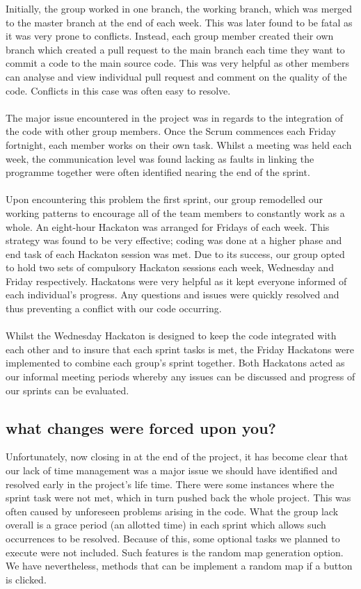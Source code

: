 \documentclass{article} \usepackage{graphicx}
\begin{document}
		Initially, the group worked in one branch, the working branch, which was merged to the master branch at the end of each week. This was later found to be fatal as it was very prone to conflicts.  Instead, each group member created their own branch which created a pull request to the main branch each time they want to commit a code to the main source code. This was very helpful as other members can analyse and view individual pull request and comment on the quality of the code.  Conflicts in this case was often easy to resolve.\\ 
		\\The major issue encountered in the project was in regards to the integration of the code with other group members. Once the Scrum commences each Friday fortnight, each member works on their own task.  Whilst a meeting was held each week, the communication level was found lacking as faults in linking the programme together were often identified nearing the end of the sprint.\\
\\Upon encountering this problem the first sprint, our group remodelled our working patterns to encourage all of the team members to constantly work as a whole.  An eight-hour Hackaton was arranged for Fridays of each week.  This strategy was found to be very effective; coding was done at a higher phase and end task of each Hackaton session was met.  Due to its success, our group opted to hold two sets of compulsory Hackaton sessions each week, Wednesday and Friday respectively.  Hackatons were very helpful as it kept everyone informed of each individual's progress. Any questions and issues were quickly resolved and thus preventing a conflict with our code occurring.\\
\\Whilst the Wednesday Hackaton is designed to keep the code integrated with each other and to insure that each sprint tasks is met, the Friday Hackatons were implemented to combine each group's sprint together. Both Hackatons acted as our informal meeting periods whereby any issues can be discussed and progress of our sprints can be evaluated.

		\subsection{what changes were forced upon you? }
			Unfortunately, now closing in at the end of the project, it has become clear that our lack of time management was a major issue we should have identified and resolved early in the project's life time. There were some instances where the sprint task were not met, which in turn pushed back the whole project. This was often caused by  unforeseen problems arising in the code. What the group lack overall is a grace period (an allotted time) in each sprint which allows such occurrences to be resolved. Because of this, some optional tasks we planned to execute were not included. Such features is the random map generation option.  We have nevertheless, methods that can be implement a random map if a button is clicked. \\
			
\end{document}
